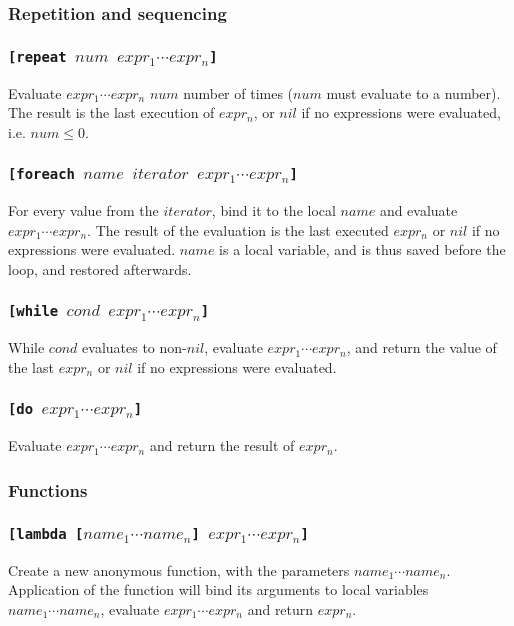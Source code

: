 \documentclass[11pt]{report}
\begin{document}
\subsubsection{Repetition and sequencing}
\subsubsection*{\tt{[repeat }$num$ $expr_1 \cdots expr_n$\tt{]}}
Evaluate $expr_1 \cdots expr_n$ $num$ number of times ($num$ must evaluate to a number). The result is the last execution of $expr_n$, or $nil$ if no expressions were evaluated, i.e. $num \leq 0$.

\subsubsection*{\tt{[foreach }$name$ $iterator$ $expr_1 \cdots expr_n$\tt{]}}
For every value from the $iterator$, bind it to the local $name$ and evaluate $expr_1 \cdots expr_n$. The result of the evaluation is the last executed $expr_n$ or $nil$ if no expressions were evaluated. $name$ is a local variable, and is thus saved before the loop, and restored afterwards.

\subsubsection*{\tt{[while }$cond$ $expr_1 \cdots expr_n$\tt{]}}
While $cond$ evaluates to non-$nil$, evaluate $expr_1 \cdots expr_n$, and return the value of the last $expr_n$ or $nil$ if no expressions were evaluated.


\subsubsection*{\tt{[do }$expr_1 \cdots expr_n$\tt{]}}
Evaluate $expr_1 \cdots expr_n$ and return the result of $expr_n$.


\subsubsection{Functions}
\subsubsection*{\tt{[lambda [}$name_1 \cdots name_n$\tt{]} $expr_1 \cdots expr_n$\tt{]}}
Create a new anonymous function, with the parameters $name_1\cdots name_n$. Application of the function will bind its arguments to local variables $name_1\cdots name_n$, evaluate $expr_1\cdots expr_n$ and return $expr_n$.
\end{document}
